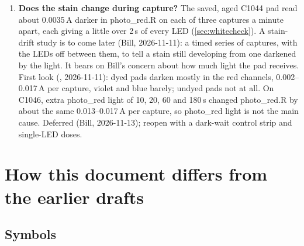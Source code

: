 \documentclass[11pt,letter]{article}
\makeatletter
\newcommand{\file}[1]{\texttt{\seqsplit{#1}}}
\newcommand{\sno}[1]{step~\@nameuse{stepno@#1}}
\newcommand{\sref}[1]{\sno{#1} (\S\ref{#1})}
\makeatother
\begin{document}
\begin{enumerate}[label=\arabic*., ref=\arabic*]
    step~2a, 2026-11-11): the same edge band reads differently in each Bayer
    layer, and the difference follows the layer's place in the Bayer
    pattern.  photo\_red.R and green.Gb agree; green.Gr and the blue layers
    agree with them only after a shift across the pad, and green.Gb and the
    blue layers only after a shift down it.  The camera runs at half
    resolution, so each layer pixel is the average of a group of four
    sensor pixels of its color; the offset between layers is therefore
    $\tfrac14$ or $\tfrac34$ of a layer pixel, not $\tfrac12$ (Bill).  The
    pad fit and the lining up are shared by all layers, which is harmless
    for each channel's own ratio (the offset is the same in both photos),
    but at the pad's edge the channels of one pixel look at slightly
    different spots, which matters for the per-pixel color of
    \sref{sec:color}.  To do: measure the offsets (each layer's edge band
    profiles give them), and decide whether to shift each layer
    before step~8.
  \item \label{op:drift} \textbf{Does the stain change during capture?}
    The saved, aged C1044 pad read about 0.0035\,A darker in photo\_red.R
    on each of three captures a minute apart, each giving a little over
    2\,s of every LED (\cref{sec:whitecheck}).  A stain-drift study is to
    come later (Bill, 2026-11-11): a timed series of captures, with the
    LEDs off between them, to tell a stain still developing from one
    darkened by the light.  It bears on Bill's concern about how much
    light the pad receives.  First look (\file{drift\_study.py},
    2026-11-11): dyed pads darken mostly in the red channels, 0.002--0.017\,A
    per capture, violet and blue barely; undyed pads not at all.  On C1046,
    extra photo\_red light of 10, 20, 60 and 180\,s changed photo\_red.R
    by about the same 0.013--0.017\,A per capture, so photo\_red light is
    not the main cause.  Deferred (Bill, 2026-11-13); reopen with a
    dark-wait control strip and single-LED doses.
\end{enumerate}

\appendix
\section{How this document differs from the earlier drafts}
\label{app:diff}

\subsection{Symbols}
\end{document}
